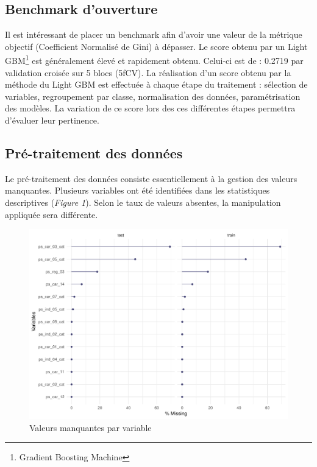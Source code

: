 \documentclass[french]{article}
\begin{document}
\begin{multicols}{2}
\subsection{Benchmark d'ouverture}

Il est intéressant de placer un benchmark afin d'avoir une valeur de la métrique objectif (Coefficient Normalisé de Gini) à dépasser. Le score obtenu par un Light GBM\footnote{Gradient Boosting Machine} est généralement élevé et rapidement obtenu. Celui-ci est de : 0.2719 par validation croisée sur 5 blocs (5fCV). La réalisation d'un score obtenu par la méthode du Light GBM est effectuée à chaque étape du traitement : sélection de variables, regroupement par classe, normalisation des données, paramétrisation des modèles. La variation de ce score lors des ces différentes étapes permettra d'évaluer leur pertinence. 


\subsection{Pré-traitement des données}

Le pré-traitement des données consiste essentiellement à la gestion des valeurs manquantes. Plusieurs variables ont été identifiées dans les statistiques descriptives (\emph{Figure 1}). Selon le taux de valeurs absentes, la manipulation appliquée sera différente. 

\begin{figure}[H] \centering
  \includegraphics[width = \columnwidth]{img/missing_values}
  \caption{Valeurs manquantes par variable}
\end{figure}


\end{multicols}
\end{document}
